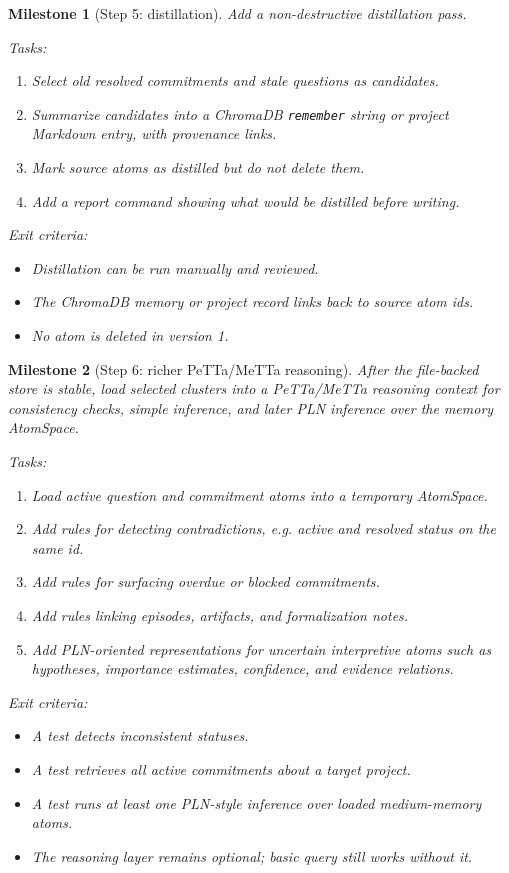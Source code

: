 \documentclass[11pt]{article}
\newtheorem{milestone}{Milestone}
\begin{document}
\begin{milestone}[Step 5: distillation]
Add a non-destructive distillation pass.

Tasks:
\begin{enumerate}
  \item Select old resolved commitments and stale questions as candidates.
  \item Summarize candidates into a ChromaDB \texttt{remember} string or project
        Markdown entry, with provenance links.
  \item Mark source atoms as distilled but do not delete them.
  \item Add a report command showing what would be distilled before writing.
\end{enumerate}

Exit criteria:
\begin{itemize}
  \item Distillation can be run manually and reviewed.
  \item The ChromaDB memory or project record links back to source atom ids.
  \item No atom is deleted in version 1.
\end{itemize}
\end{milestone}

\begin{milestone}[Step 6: richer PeTTa/MeTTa reasoning]
After the file-backed store is stable, load selected clusters into a PeTTa/MeTTa
reasoning context for consistency checks, simple inference, and later PLN inference
over the memory AtomSpace.

Tasks:
\begin{enumerate}
  \item Load active question and commitment atoms into a temporary AtomSpace.
  \item Add rules for detecting contradictions, e.g. active and resolved status on
        the same id.
  \item Add rules for surfacing overdue or blocked commitments.
  \item Add rules linking episodes, artifacts, and formalization notes.
  \item Add PLN-oriented representations for uncertain interpretive atoms such as
        hypotheses, importance estimates, confidence, and evidence relations.
\end{enumerate}

Exit criteria:
\begin{itemize}
  \item A test detects inconsistent statuses.
  \item A test retrieves all active commitments about a target project.
  \item A test runs at least one PLN-style inference over loaded medium-memory atoms.
  \item The reasoning layer remains optional; basic query still works without it.
\end{itemize}
\end{milestone}
\end{document}
